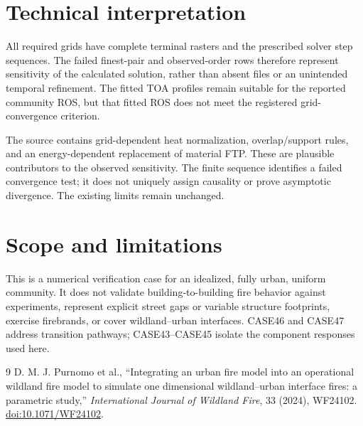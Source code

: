 \section{Technical interpretation}

All required grids have complete terminal rasters and the prescribed solver
step sequences. The failed finest-pair and observed-order rows therefore
represent sensitivity of the calculated solution, rather than absent files or
an unintended temporal refinement. The fitted TOA profiles remain suitable
for the reported community ROS, but that fitted ROS does not meet the
registered grid-convergence criterion.

The source contains grid-dependent heat normalization, overlap/support rules,
and an energy-dependent replacement of material FTP. These are plausible
contributors to the observed sensitivity. The finite sequence identifies a
failed convergence test; it does not uniquely assign causality or prove
asymptotic divergence. The existing limits remain unchanged.

\section{Scope and limitations}
This is a numerical verification case for an idealized, fully urban, uniform community. It does not validate building-to-building fire behavior against experiments, represent explicit street gaps or variable structure footprints, exercise firebrands, or cover wildland--urban interfaces. CASE46 and CASE47 address transition pathways; CASE43--CASE45 isolate the component responses used here.

\begin{thebibliography}{9}
 D. M. J. Purnomo et al., ``Integrating an urban fire model into an operational wildland fire model to simulate one dimensional wildland--urban interface fires: a parametric study,'' \emph{International Journal of Wildland Fire}, 33 (2024), WF24102. \href{https://doi.org/10.1071/WF24102}{doi:10.1071/WF24102}.
\end{thebibliography}
